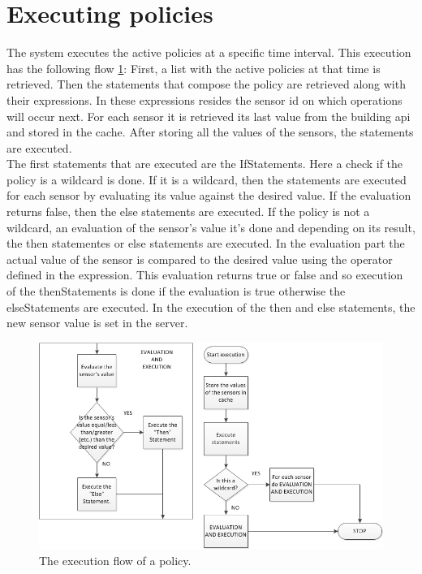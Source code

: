 \section{Executing policies} 
The system executes the active policies at a specific time interval. This execution has the following flow \ref{fig:policy_execution_workflow}:
First, a list with the active policies at that time is retrieved. Then the statements that compose the policy are retrieved along with their expressions. In these expressions resides the sensor id on which operations will occur next. For each sensor it is retrieved its last value from the building api and stored in the cache. After storing all the values of the sensors, the statements are executed. 
\\The first statements that are executed are the IfStatements. Here a check if the policy is a wildcard is done.  If it is a wildcard, then the statements are executed for each sensor by evaluating its value against the desired value. If the evaluation returns false, then the else statements are executed. If the policy is not a wildcard, an evaluation of the sensor's value it's done and depending on its result, the then statementes or else statements are executed. 
In the evaluation part the actual value of the sensor is compared to the desired value using the operator defined in the expression. This evaluation returns true or false and so execution of the thenStatements is done if the evaluation is true otherwise the elseStatements are executed.
In the execution of the then and else statements, the new sensor value is set in the server. 

\begin{figure}
	\centering
    \includegraphics[scale=0.65]{images/policy_execution_flow.png} 
	\caption{The execution flow of a policy.}
	\label{fig:policy_execution_workflow}
\end{figure}